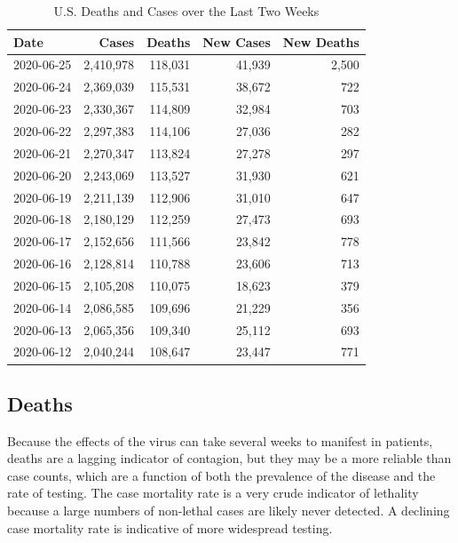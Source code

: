 \documentclass[]{article}
\begin{document}
\begin{table}[!h]

\caption{\label{tab:unnamed-chunk-8}U.S. Deaths and Cases over the Last Two Weeks}
\centering
\begin{tabular}{l|r|r|r|r}
\hline
Date & Cases & Deaths & New Cases & New Deaths\\
\hline
2020-06-25 & 2,410,978 & 118,031 & 41,939 & 2,500\\
\hline
2020-06-24 & 2,369,039 & 115,531 & 38,672 & 722\\
\hline
2020-06-23 & 2,330,367 & 114,809 & 32,984 & 703\\
\hline
2020-06-22 & 2,297,383 & 114,106 & 27,036 & 282\\
\hline
2020-06-21 & 2,270,347 & 113,824 & 27,278 & 297\\
\hline
2020-06-20 & 2,243,069 & 113,527 & 31,930 & 621\\
\hline
2020-06-19 & 2,211,139 & 112,906 & 31,010 & 647\\
\hline
2020-06-18 & 2,180,129 & 112,259 & 27,473 & 693\\
\hline
2020-06-17 & 2,152,656 & 111,566 & 23,842 & 778\\
\hline
2020-06-16 & 2,128,814 & 110,788 & 23,606 & 713\\
\hline
2020-06-15 & 2,105,208 & 110,075 & 18,623 & 379\\
\hline
2020-06-14 & 2,086,585 & 109,696 & 21,229 & 356\\
\hline
2020-06-13 & 2,065,356 & 109,340 & 25,112 & 693\\
\hline
2020-06-12 & 2,040,244 & 108,647 & 23,447 & 771\\
\hline
\end{tabular}
\end{table}

\newpage

\hypertarget{deaths}{%
\subsection{Deaths}\label{deaths}}

Because the effects of the virus can take several weeks to manifest in
patients, deaths are a lagging indicator of contagion, but they may be a
more reliable than case counts, which are a function of both the
prevalence of the disease and the rate of testing. The case mortality
rate is a very crude indicator of lethality because a large numbers of
non-lethal cases are likely never detected. A declining case mortality
rate is indicative of more widespread testing.
\end{document}
